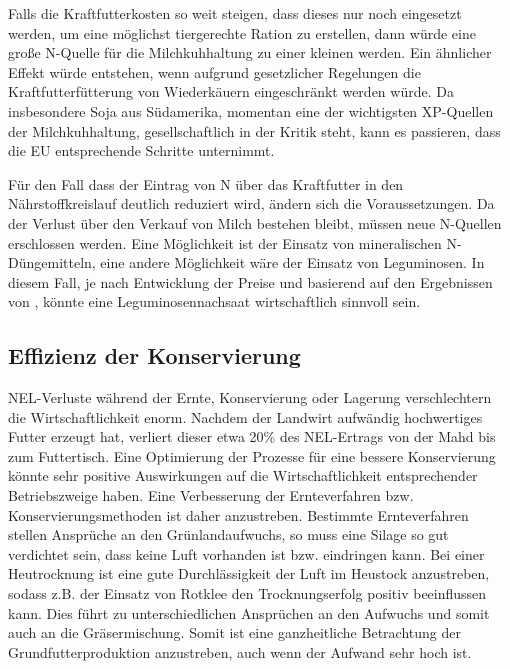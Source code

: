 Falls die Kraftfutterkosten so weit steigen, dass dieses nur noch eingesetzt werden, um eine möglichst tiergerechte Ration zu erstellen, dann würde eine große N-Quelle für die Milchkuhhaltung zu einer kleinen werden.
Ein ähnlicher Effekt würde entstehen, wenn aufgrund gesetzlicher Regelungen die Kraftfutterfütterung von Wiederkäuern eingeschränkt werden würde.
Da insbesondere Soja aus Südamerika, momentan eine der wichtigsten \ac{XP}-Quellen  der Milchkuhhaltung, gesellschaftlich in der Kritik steht, kann es passieren, dass die \ac{EU} entsprechende Schritte unternimmt.

Für den Fall dass der Eintrag von N über das Kraftfutter in den Nährstoffkreislauf deutlich reduziert wird, ändern sich die Voraussetzungen.
Da der Verlust über den Verkauf von Milch bestehen bleibt, müssen neue N-Quellen erschlossen werden.
Eine Möglichkeit ist der Einsatz von mineralischen N-Düngemitteln, eine andere Möglichkeit wäre der Einsatz von Leguminosen.
In diesem Fall, je nach Entwicklung der Preise und basierend auf den Ergebnissen von \textcite[33-36]{weggler2050leguminosen}, könnte eine Leguminosennachsaat wirtschaftlich sinnvoll sein.


\subsection{Effizienz der Konservierung}
\label{sub:konservierung}
\ac{NEL}-Verluste während der Ernte, Konservierung oder Lagerung verschlechtern die Wirtschaftlichkeit enorm.
Nachdem der Landwirt aufwändig hochwertiges Futter erzeugt hat, verliert dieser etwa 20\% des \ac{NEL}-Ertrags von der Mahd bis zum Futtertisch.
Eine Optimierung der Prozesse für eine bessere Konservierung könnte sehr positive Auswirkungen auf die Wirtschaftlichkeit entsprechender Betriebszweige haben.
Eine Verbesserung der Ernteverfahren bzw. Konservierungsmethoden ist daher anzustreben.
Bestimmte Ernteverfahren stellen Ansprüche an den Grünlandaufwuchs, so muss eine Silage so gut verdichtet sein, dass keine Luft vorhanden ist bzw. eindringen kann.
Bei einer Heutrocknung ist eine gute Durchlässigkeit der Luft im Heustock anzustreben, sodass z.B. der Einsatz von Rotklee den Trocknungserfolg positiv beeinflussen kann.
Dies führt zu unterschiedlichen Ansprüchen an den Aufwuchs und somit auch an die Gräsermischung.
Somit ist eine ganzheitliche Betrachtung der Grundfutterproduktion anzustreben, auch wenn der Aufwand sehr hoch ist.


